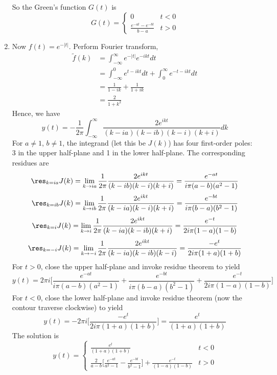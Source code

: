 \documentclass[a4paper]{article}
\begin{document}
\begin{ans}
\begin{enumerate}[label=(\roman*)]
So the Green's function $G(t)$ is
$$G(t)=
\left\{
        \begin{array}{ll}
      0& t<0 \\
      \frac{e^{-at}-e^{-bt}}{b-a} & t>0
      \end{array}
    \right.$$
\item Now $f(t)=e^{-|t|}$. Perform Fourier transform,
\begin{align}
    \tilde{f}(k)&=\int_{-\infty}^\infty e^{-|t|}e^{-ikt}dt\nonumber\\&=\int_{-\infty}^0 e^{t-ikt}dt+\int_0^\infty e^{-t-ikt}dt\nonumber\\&=\frac{1}{1-ik}+\frac{1}{1+ik}\nonumber\\&=\frac{2}{1+k^2}\nonumber
\end{align}
Hence, we have
$$y(t)=-\frac{1}{2\pi}\int_{-\infty}^\infty\frac{2e^{ikt}}{(k-ia)(k-ib)(k-i)(k+i)}dk$$
For $a\neq 1$, $b\neq 1$, the integrand (let this be $J(k)$) has four first-order poles: 3 in the upper half-plane and 1 in the lower half-plane. The corresponding residues are
$$\res_{k=ia}J(k)=\lim_{k\rightarrow ia}\frac{1}{2\pi}\frac{2e^{ikt}}{(k-ib)(k-i)(k+i)}=\frac{e^{-at}}{i\pi(a-b)(a^2-1)}$$
$$\res_{k=ib}J(k)=\lim_{k\rightarrow ib}\frac{1}{2\pi}\frac{2e^{ikt}}{(k-ia)(k-i)(k+i)}=\frac{e^{-bt}}{i\pi(b-a)(b^2-1)}$$
$$\res_{k=i}J(k)=\lim_{k\rightarrow i}\frac{1}{2\pi}\frac{2e^{ikt}}{(k-ia)(k-ib)(k+i)}=\frac{e^{-t}}{2i\pi(1-a)(1-b)}$$
$$\res_{k=-i}J(k)=\lim_{k\rightarrow -i}\frac{1}{2\pi}\frac{2e^{ikt}}{(k-ia)(k-ib)(k-i)}=\frac{-e^{t}}{2i\pi(1+a)(1+b)}$$
For $t>0$, close the upper half-plane and invoke residue theorem to yield
$$y(t)=2\pi i\bigg[\frac{e^{-at}}{i\pi(a-b)(a^2-1)}+\frac{e^{-bt}}{i\pi(b-a)(b^2-1)}+\frac{e^{-t}}{2i\pi(1-a)(1-b)}\bigg]$$
For $t<0$, close the lower half-plane and invoke residue theorem (now the contour traverse clockwise) to yield
$$y(t)=-2\pi i\bigg[\frac{-e^t}{2i\pi(1+a)(1+b)}\bigg]=\frac{e^t}{(1+a)(1+b)}$$
The solution is
$$y(t)=
\left\{
        \begin{array}{ll}
      \frac{e^t}{(1+a)(1+b)}& t<0 \\
      \frac{2}{a-b}\bigg[\frac{e^{-at}}{a^2-1}-\frac{e^{-bt}}{b^2-1}\bigg]+\frac{e^{-t}}{(1-a)(1-b)}& t>0
        \end{array}
    \right.$$
\end{enumerate}
\end{ans}
\newpage
\end{document}
